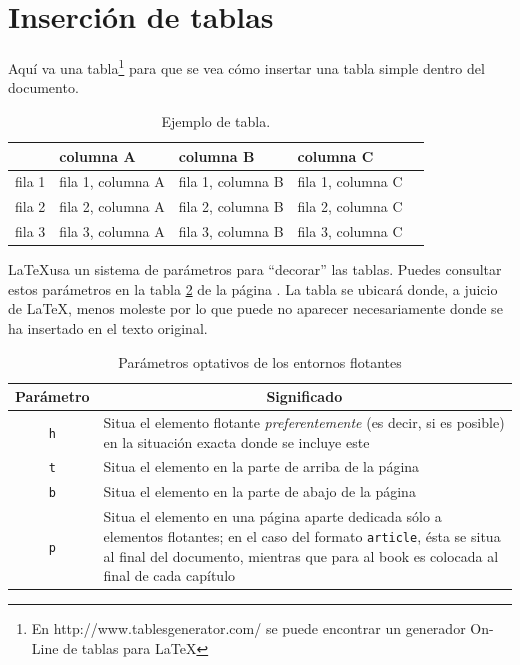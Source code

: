 \section{Inserción de tablas}

Aquí va una tabla\footnote{En http://www.tablesgenerator.com/ se puede encontrar un generador On-Line de tablas para \LaTeX} para que se vea cómo insertar una tabla simple dentro del documento.

\begin{table}[h]
\begin{center}
\begin{tabular}{lllll}
&columna A&columna B&columna C\\
\hline
fila 1&fila 1, columna A & fila 1, columna B & fila 1, columna C\\
fila 2&fila 2, columna A & fila 2, columna B & fila 2, columna C\\
fila 3&fila 3, columna A & fila 3, columna B & fila 3, columna C\\ \hline
\end{tabular}
\end{center}
\caption{Ejemplo de tabla.}
\label{tabladeejemplo}
\end{table}

\LaTeX usa un sistema de parámetros para ``decorar'' las tablas. Puedes consultar estos parámetros en la tabla \ref{tabla_parametros} de la página \pageref{tabla_parametros}. La tabla se ubicará donde, a juicio de \LaTeX, menos moleste por lo que puede no aparecer necesariamente donde se ha insertado en el texto original. 

\begin{table}
\begin{center}
\begin{tabular}{|c|p{}|}
\hline
Parámetro & \multicolumn{1}{c|}{Significado} \\ \hline
\texttt{h} & Situa el elemento flotante \emph{preferentemente}
(es decir, si es posible) en la situación exacta donde se incluye este \\
\texttt{t} & Situa el elemento en la parte de arriba de la página \\
\texttt{b} & Situa el elemento en la parte de abajo de la página \\
\texttt{p} & Situa el elemento en una página aparte dedicada sólo a
elementos flotantes; en el caso del formato \texttt{article},
ésta se situa al final del documento, mientras que para al book es
colocada al final de cada capítulo \\ \hline
\end{tabular}
\end{center}
\caption{Parámetros optativos de los entornos flotantes}
\label{tabla_parametros}
\end{table}



